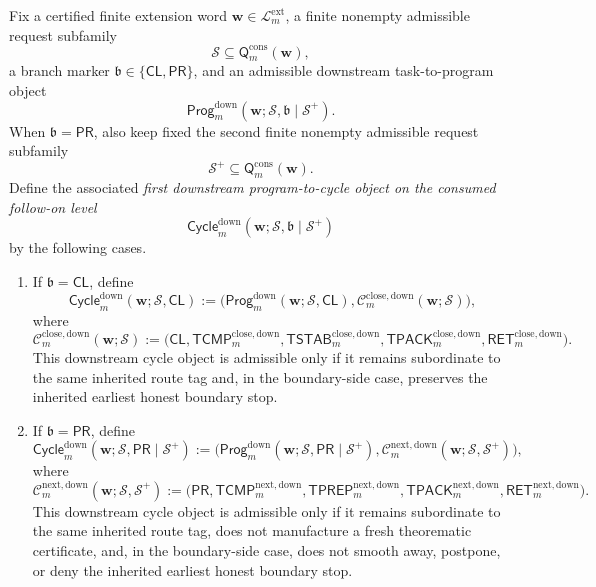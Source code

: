 \begin{definition}
\label{def:first-downstream-program-to-cycle-object-on-the-consumed-follow-on-level}
Fix a certified finite extension word \(\mathbf w\in\mathcal L^{\mathrm{ext}}_{m}\), a finite nonempty admissible request subfamily
\[
 \mathcal S \subseteq \mathsf{Q}^{\mathrm{cons}}_{m}(\mathbf w),
\]
a branch marker \(\mathfrak b\in\{\mathsf{CL},\mathsf{PR}\}\), and an admissible downstream task-to-program object
\[
 \mathsf{Prog}^{\mathrm{down}}_{m}(\mathbf w;\mathcal S,\mathfrak b\mid\mathcal S^{+}).
\]
When \(\mathfrak b=\mathsf{PR}\), also keep fixed the second finite nonempty admissible request subfamily
\[
 \mathcal S^{+}\subseteq \mathsf{Q}^{\mathrm{cons}}_{m}(\mathbf w).
\]
Define the associated \emph{first downstream program-to-cycle object on the consumed follow-on level}
\[
 \mathsf{Cycle}^{\mathrm{down}}_{m}(\mathbf w;\mathcal S,\mathfrak b\mid\mathcal S^{+})
\]
by the following cases.
\begin{enumerate}[label=(\roman*)]
 \item If \(\mathfrak b=\mathsf{CL}\), define
{\small
\[
 \mathsf{Cycle}^{\mathrm{down}}_{m}(\mathbf w;\mathcal S,\mathsf{CL})
 :=
 \bigl(\mathsf{Prog}^{\mathrm{down}}_{m}(\mathbf w;\mathcal S,\mathsf{CL}),\mathcal C^{\mathrm{close,down}}_{m}(\mathbf w;\mathcal S)\bigr),
\]
}
where
{\small
\[
 \mathcal C^{\mathrm{close,down}}_{m}(\mathbf w;\mathcal S)
 :=
 \bigl(\mathsf{CL},\mathsf{TCMP}^{\mathrm{close,down}}_{m},\mathsf{TSTAB}^{\mathrm{close,down}}_{m},\mathsf{TPACK}^{\mathrm{close,down}}_{m},\mathsf{RET}^{\mathrm{close,down}}_{m}\bigr).
\]
}
This downstream cycle object is admissible only if it remains subordinate to the same inherited route tag and, in the boundary-side case, preserves the inherited earliest honest boundary stop.

 \item If \(\mathfrak b=\mathsf{PR}\), define
{\small
\[
 \mathsf{Cycle}^{\mathrm{down}}_{m}(\mathbf w;\mathcal S,\mathsf{PR}\mid\mathcal S^{+})
 :=
 \bigl(\mathsf{Prog}^{\mathrm{down}}_{m}(\mathbf w;\mathcal S,\mathsf{PR}\mid\mathcal S^{+}),\mathcal C^{\mathrm{next,down}}_{m}(\mathbf w;\mathcal S,\mathcal S^{+})\bigr),
\]
}
where
{\small
\[
 \mathcal C^{\mathrm{next,down}}_{m}(\mathbf w;\mathcal S,\mathcal S^{+})
 :=
 \bigl(\mathsf{PR},\mathsf{TCMP}^{\mathrm{next,down}}_{m},\mathsf{TPREP}^{\mathrm{next,down}}_{m},\mathsf{TPACK}^{\mathrm{next,down}}_{m},\mathsf{RET}^{\mathrm{next,down}}_{m}\bigr).
\]
}
This downstream cycle object is admissible only if it remains subordinate to the same inherited route tag, does not manufacture a fresh theorematic certificate, and, in the boundary-side case, does not smooth away, postpone, or deny the inherited earliest honest boundary stop.
\end{enumerate}
\end{definition}

